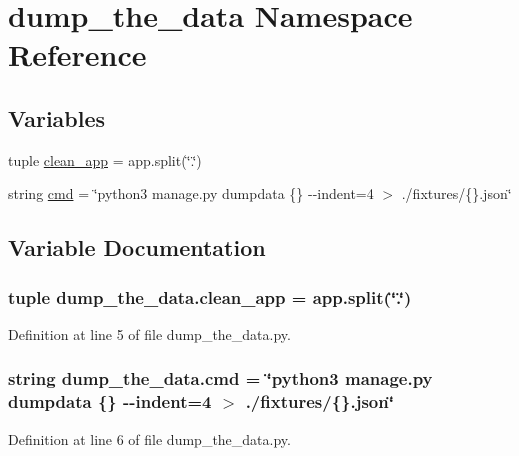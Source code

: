 \hypertarget{namespacedump__the__data}{\section{dump\-\_\-the\-\_\-data Namespace Reference}
\label{namespacedump__the__data}
}
\subsection*{Variables}
\begin{DoxyCompactItemize}
\item 
tuple \hyperlink{namespacedump__the__data_a255c76eaeebc70a94f1ff36f2ebb5c4f}{clean\-\_\-app} = app.\-split(\char`\"{}.\char`\"{})
\item 
string \hyperlink{namespacedump__the__data_a55a83d0615df461e4abfcccd8debfd86}{cmd} = \char`\"{}python3 manage.\-py dumpdata \{\} -\/-\/indent=4 $>$ ./fixtures/\{\}.json\char`\"{}
\end{DoxyCompactItemize}


\subsection{Variable Documentation}
\hypertarget{namespacedump__the__data_a255c76eaeebc70a94f1ff36f2ebb5c4f}{
\subsubsection[{clean\-\_\-app}]{\setlength{\rightskip}{0pt plus 5cm}tuple dump\-\_\-the\-\_\-data.\-clean\-\_\-app = app.\-split(\char`\"{}.\char`\"{})}}\label{namespacedump__the__data_a255c76eaeebc70a94f1ff36f2ebb5c4f}


Definition at line 5 of file dump\-\_\-the\-\_\-data.\-py.

\hypertarget{namespacedump__the__data_a55a83d0615df461e4abfcccd8debfd86}{
\subsubsection[{cmd}]{\setlength{\rightskip}{0pt plus 5cm}string dump\-\_\-the\-\_\-data.\-cmd = \char`\"{}python3 manage.\-py dumpdata \{\} -\/-\/indent=4 $>$ ./fixtures/\{\}.json\char`\"{}}}\label{namespacedump__the__data_a55a83d0615df461e4abfcccd8debfd86}


Definition at line 6 of file dump\-\_\-the\-\_\-data.\-py.

